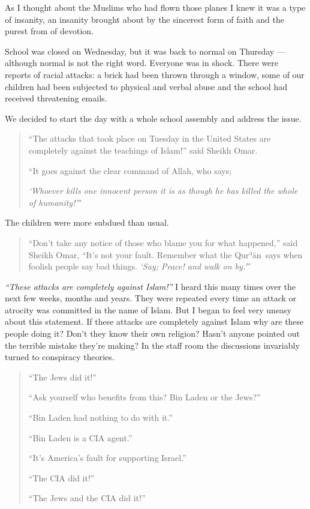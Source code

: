 \documentclass[12pt]{memoir}
\def\´{ʾ} %
\def \Quran{Qur\-\´ān} %
\begin{document}
As I thought about the Muslims who had flown those planes
I knew it was a type of insanity,
an insanity brought about by the sincerest form of faith
and the purest from of devotion.

School was closed on Wednesday, but it was back to normal on Thursday —
although normal is not the right word.
Everyone was in shock.
There were reports of racial attacks:
a brick had been thrown through a window,
some of our children had been subjected to physical
and verbal abuse and the school had received threatening emails.

We decided to start the day with a whole school assembly
and address the issue.

\begin{quote}
“The attacks that took place on Tuesday in the United States
are completely against the teachings of Islam!” said Sheikh Omar.

“It goes against the clear command of Allah, who says;

\emph{‘Whoever kills one innocent person it is as though
he has killed the whole of humanity!’}”
\end{quote}

The children were more subdued than usual.

\begin{quote}
“Don’t take any notice of those who blame you for what happened,”
said Sheikh Omar, “It’s not your fault.
Remember what the \Quran\ says when foolish people say bad things.
\emph{‘Say; Peace! and walk on by.’}”
\end{quote}

\emph{“These attacks are completely against Islam!”}
I heard this many times over the next few weeks, months and years.
They were repeated every time an attack or atrocity was committed
in the name of Islam.
But I began to feel very uneasy about this statement.
If these attacks are completely against Islam why are these people doing it?
Don’t they know their own religion?
Hasn’t anyone pointed out the terrible mistake they’re making?
In the staff room the discussions invariably turned to conspiracy theories.

\begin{quote}
“The Jews did it!”

“Ask yourself who benefits from this? Bin Laden or the Jews?”

“Bin Laden had nothing to do with it.”

“Bin Laden is a CIA agent.”

“It’s America’s fault for supporting Israel.”

“The CIA did it!”

“The Jews and the CIA did it!”
\end{quote}
\end{document}
